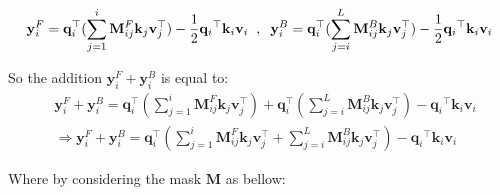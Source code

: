 \begin{align}
    \mathbf{y}^{F}_i = \mathbf{q}^{\top}_i(\sum_{j=1}^i \mathbf{M}^{F}_{ij}\mathbf{k}_j\mathbf{v}^{\top}_j)
    - \frac{1}{2}{{\mathbf{q}_i}}^{\top} \mathbf{k}_i \mathbf{v}_i
    \hspace{2mm}
    ,
    \hspace{2mm}
     \mathbf{y}^{B}_i = \mathbf{q}^{\top}_i(\sum_{j=i}^L \mathbf{M}^{B}_{ij}\mathbf{k}_j\mathbf{v}^{\top}_j)
     - \frac{1}{2}{{\mathbf{q}_i}}^{\top} \mathbf{k}_i \mathbf{v}_i
\end{align}

So the addition $\mathbf{y}^{F}_i + \mathbf{y}^{B}_i $ is equal to:
\begin{align}
\label{eq:54}
    & \mathbf{y}^{F}_i + \mathbf{y}^{B}_i = \mathbf{q}^{\top}_i(\sum_{j=1}^i \mathbf{M}^{F}_{ij}\mathbf{k}_j\mathbf{v}^{\top}_j)+\mathbf{q}^{\top}_i(\sum_{j=i}^L \mathbf{M}^{B}_{ij}\mathbf{k}_j\mathbf{v}^{\top}_j) - {{\mathbf{q}_i}}^{\top} \mathbf{k}_i \mathbf{v}_i \\
    & \Rightarrow \mathbf{y}^{F}_i + \mathbf{y}^{B}_i =
     \mathbf{q}^{\top}_i(\sum_{j=1}^i \mathbf{M}^{F}_{ij}\mathbf{k}_j\mathbf{v}^{\top}_j + \sum_{j=i}^L \mathbf{M}^{B}_{ij}\mathbf{k}_j\mathbf{v}^{\top}_j)  - {{\mathbf{q}_i}}^{\top} \mathbf{k}_i \mathbf{v}_i
\end{align}

Where by considering the mask $\mathbf{M}$ as bellow:


